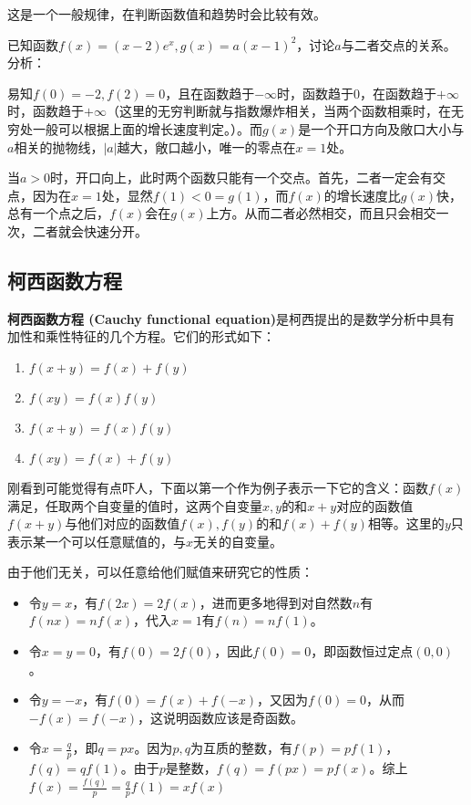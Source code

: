 这是一个一般规律，在判断函数值和趋势时会比较有效。
\begin{example}{已知函数$f(x)=(x-2)e^x,g(x)=a(x-1)^2$，讨论$a$与二者交点的关系。}
分析：

易知$f(0)=-2,f(2)=0$，且在函数趋于$-\infty$时，函数趋于$0$，在函数趋于$+\infty$时，函数趋于$+\infty$（这里的无穷判断就与指数爆炸相关，当两个函数相乘时，在无穷处一般可以根据上面的增长速度判定。）。而$g(x)$是一个开口方向及敞口大小与$a$相关的抛物线，$|a|$越大，敞口越小，唯一的零点在$x=1$处。

当$a>0$时，开口向上，此时两个函数只能有一个交点。首先，二者一定会有交点，因为在$x=1$处，显然$f(1)<0=g(1)$，而$f(x)$的增长速度比$g(x)$快，总有一个点之后，$f(x)$会在$g(x)$上方。从而二者必然相交，而且只会相交一次，二者就会快速分开。

\end{example}

\subsection{柯西函数方程}

\textbf{柯西函数方程 (Cauchy functional equation)}是柯西提出的是数学分析中具有加性和乘性特征的几个方程。它们的形式如下：
\begin{enumerate}
\item $f(x+y)=f(x)+f(y)$
\item $f(xy) = f(x) f(y)$
\item $f(x+y)=f(x)f(y)$
\item $f(xy) = f(x)+f(y)$
\end{enumerate}

刚看到可能觉得有点吓人，下面以第一个作为例子表示一下它的含义：函数$f(x)$满足，任取两个自变量的值时，这两个自变量$x,y$的和$x+y$对应的函数值$f(x+y)$与他们对应的函数值$f(x),f(y)$的和$f(x)+f(y)$相等。这里的$y$只表示某一个可以任意赋值的，与$x$无关的自变量。

由于他们无关，可以任意给他们赋值来研究它的性质：
\begin{itemize}
\item 令$y=x$，有$f(2x)=2f(x)$，进而更多地得到对自然数$n$有$f(nx)=nf(x)$，代入$x=1$有$f(n)=nf(1)$。
\item 令$x=y=0$，有$f(0)=2f(0)$，因此$f(0)=0$，即函数恒过定点$(0,0)$。
\item 令$y=-x$，有$f(0)=f(x)+f(-x)$，又因为$f(0)=0$，从而$-f(x)=f(-x)$，这说明函数应该是奇函数。
\item 令$\displaystyle x=\frac{q}{p}$，即$q=px$。因为$p,q$为互质的整数，有$f(p)=pf(1)$，$f(q)=qf(1)$。由于$p$是整数，$f(q)=f(px)=pf(x)$。综上$\displaystyle f(x)=\frac{f(q)}{p}=\frac{q}{p}f(1)=xf(x)$
\end{itemize}


